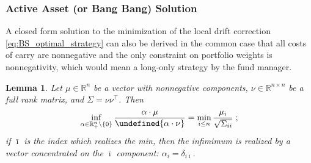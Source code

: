 \documentclass[11pt]{article}
\newtheorem{lemma}[theorem]{Lemma}
\newcommand{\tr}[1]{{#1}^{\intercal}} %
\let\norm\undefined %
\DeclarePairedDelimiter\norm{\lVert}{\rVert}
\begin{document}
\subsubsection{Active Asset (or Bang Bang) Solution}
A closed form solution to the minimization of the local drift correction \eqref{eq:BS_optimal_strategy} can also be derived in the common case that all costs of carry are nonnegative and the only constraint on portfolio weights is nonnegativity, which would mean a long-only strategy by the fund manager.

\begin{lemma}
	Let $\mu \in \mathbb{R}^n$ be a vector with nonnegative components, $\nu \in \mathbb{R}^{n\times n}$ be a full rank matrix, and $\Sigma = \nu \tr{\nu}$. Then
	\begin{equation}\label{eq:inf}
		\inf_{\alpha \in \mathbb{R}_{+}^n \setminus \{0\}} \frac{\alpha \cdot \mu}{\norm{\alpha \cdot \nu}} = \min_{i\leq n} \frac{\mu_i}{\sqrt{\Sigma_{ii}}} \; ;
	\end{equation}
	if $\bar{\imath}$ is the index which realizes the min, then the infimimum is realized by a vector concentrated on the $\bar{\imath}$ component: $\alpha_i = \delta_{i\bar{\imath}}$. 
\end{lemma}
\end{document}
